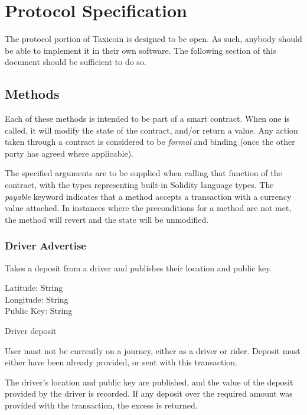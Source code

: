 \section{Protocol Specification}

The protocol portion of Taxicoin is designed to be open. As such, anybody should be able to implement it in their own software. The following section of this document should be sufficient to do so.

\subsection{Methods}

Each of these methods is intended to be part of a smart contract. When one is called, it will modify the state of the contract, and/or return a value. Any action taken through a contract is considered to be \textit{formal} and binding (once the other party has agreed where applicable).

The specified arguments are to be supplied when calling that function of the contract, with the types representing built-in Solidity language types. The \textit{payable} keyword indicates that a method accepts a transaction with a currency value attached. In instances where the preconditions for a method are not met, the method will revert and the state will be unmodified.

\subsubsection{Driver Advertise}

\begin{description}[leftmargin=8em,style=nextline]
	\item [Description]
		Takes a deposit from a driver and publishes their location and public key.
	\item [Arguments]
		Latitude: String\footnotemark \\
		Longitude: String \\
		Public Key: String
	\item [Payable]
		Driver deposit
	\item [Preconditions]
		User must not be currently on a journey, either as a driver or rider. Deposit must either have been already provided, or sent with this transaction.
	\item [Postconditions]
		The driver's location and public key are published, and the value of the deposit provided by the driver is recorded. If any deposit over the required amount was provided with the transaction, the excess is returned.
\end{description}

